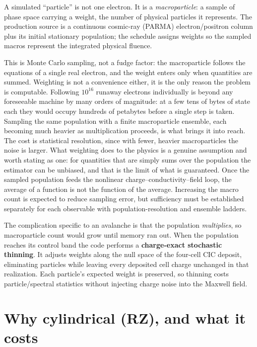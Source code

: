 \documentclass[11pt]{article}
\begin{document}
A simulated ``particle'' is not one electron. It is a \emph{macroparticle}: a
sample of phase space carrying a weight, the number of physical particles it
represents. The production source is a continuous cosmic-ray (PARMA)
electron/positron column plus its initial stationary population; the schedule
assigns weights so the sampled macros represent the integrated physical
fluence.

This is Monte Carlo sampling, not a fudge factor: the macroparticle follows the
equations of a single real electron, and the weight enters only when quantities
are summed. Weighting is not a convenience either, it is the only reason the
problem is computable. Following $10^{16}$ runaway electrons individually is
beyond any foreseeable machine by many orders of magnitude: at a few tens of
bytes of state each they would occupy hundreds of petabytes before a single
step is taken.
Sampling the same population with a finite macroparticle ensemble, each becoming
much heavier as multiplication proceeds, is what brings it into reach. The
cost is statistical resolution, since with fewer, heavier macroparticles the
noise is larger. What weighting does to the physics is a genuine assumption and
worth stating as one: for quantities that are simply sums over the population
the estimator can be unbiased, and that is the limit of what is guaranteed.
Once the sampled population feeds the nonlinear charge--conductivity--field
loop, the average of a function is not the function of the average. Increasing
the macro count is expected to reduce sampling error, but sufficiency must be
established separately for each observable with population-resolution and
ensemble ladders.

The complication specific to an avalanche is that the population
\emph{multiplies}, so macroparticle count would grow until memory ran out. When
the population reaches its control band the code performs a
\textbf{charge-exact stochastic thinning}.  It adjusts weights along the null
space of the four-cell CIC deposit, eliminating particles while leaving every
deposited cell charge unchanged in that realization.  Each particle's expected
weight is preserved, so thinning costs particle/spectral statistics without
injecting charge noise into the Maxwell field.

\section{Why cylindrical (RZ), and what it costs}
\label{sec:rz}
\end{document}
